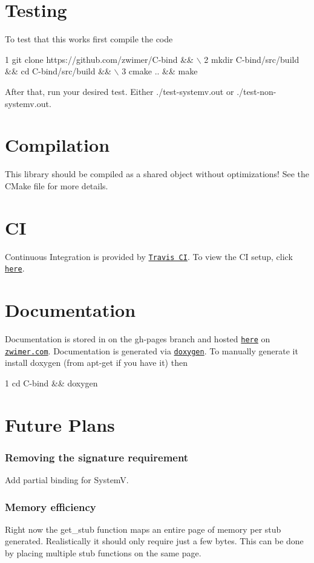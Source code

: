\section*{Testing}

To test that this works first compile the code 
\begin{DoxyCode}
1 git clone https://github.com/zwimer/C-bind && \(\backslash\)
2 mkdir C-bind/src/build && cd C-bind/src/build && \(\backslash\)
3 cmake .. && make
\end{DoxyCode}


After that, run your desired test. Either {\ttfamily ./test-\/systemv.out} or {\ttfamily ./test-\/non-\/systemv.out}.

\section*{Compilation}

This library should be compiled as a shared object without optimizations! See the {\ttfamily C\+Make} file for more details.

\section*{CI}

Continuous Integration is provided by \href{https://travis-ci.org}{\tt Travis CI}. To view the CI setup, click \href{https://travis-ci.org/zwimer/C-bind/}{\tt here}.

\section*{Documentation}

Documentation is stored in on the {\ttfamily gh-\/pages} branch and hosted \href{https://zwimer.github.io/C-bind/docs/html/index.html}{\tt here} on \href{https://zwimer.com}{\tt zwimer.\+com}. Documentation is generated via \href{http://www.doxygen.nl/}{\tt doxygen}. To manually generate it install doxygen (from {\ttfamily apt-\/get} if you have it) then 
\begin{DoxyCode}
1 cd C-bind && doxygen
\end{DoxyCode}


\section*{Future Plans}

\subsubsection*{Removing the signature requirement}

Add partial binding for SystemV.

\subsubsection*{Memory efficiency}

Right now the {\ttfamily get\+\_\+stub} function maps an entire page of memory per stub generated. Realistically it should only require just a few bytes. This can be done by placing multiple stub functions on the same page. 